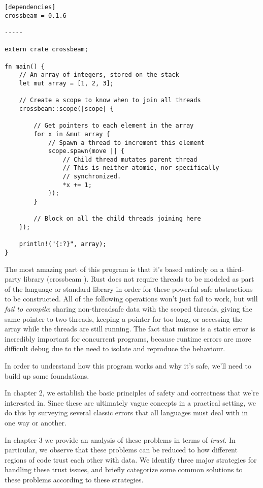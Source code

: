 \begin{verbatim}
[dependencies]
crossbeam = 0.1.6

-----

extern crate crossbeam;

fn main() {
    // An array of integers, stored on the stack
    let mut array = [1, 2, 3];

    // Create a scope to know when to join all threads
    crossbeam::scope(|scope| {

        // Get pointers to each element in the array
        for x in &mut array {
            // Spawn a thread to increment this element
            scope.spawn(move || {
                // Child thread mutates parent thread
                // This is neither atomic, nor specifically
                // synchronized.
                *x += 1;
            });
        }

        // Block on all the child threads joining here
    });

    println!("{:?}", array);
}
\end{verbatim}

The most amazing part of this program is that it's based entirely on a third-
party library (crossbeam \cite{crossbeam}). Rust does not require threads to be modeled as part
of the language or standard library in order for these powerful safe
abstractions to be constructed. All of the following operations won't just fail
to work, but will \emph{fail to compile}: sharing non-threadsafe data with
the scoped threads, giving the same pointer to two threads, keeping a pointer for too
long, or accessing the array while the threads are still running. The fact that
misuse is a static error is incredibly important for concurrent programs, because
runtime errors are more difficult debug due to the need to isolate and reproduce
the behaviour.

In order to understand how this program works and why it's safe, we'll need to
build up some foundations.

In chapter 2, we establish the basic principles of
safety and correctness that we're interested in. Since these are ultimately
vague concepts in a practical setting, we do this by surveying several classic
errors that all languages must deal with in one way or another.

In chapter 3 we provide an analysis of these problems in terms of \emph{trust}.
In particular, we observe that these problems can be reduced to how different
regions of code trust each other with data. We identify three major strategies for handling
these trust issues, and briefly categorize some common solutions to these problems
according to these strategies.

